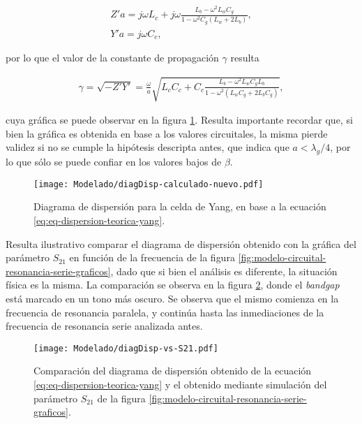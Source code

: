 \begin{align}
	Z' a = j\omega L_c + j\omega \frac{L_b - \omega^2 L_w C_g}{1-\omega^2 C_g (L_w + 2 L_b)}, \\
	Y' a = j \omega C_c,
\end{align}

por lo que el valor de la constante de propagación $\gamma$ resulta

\begin{align}
	\label{eq:eq-dispersion-teorica-yang}
	\gamma = \sqrt{-Z' Y'} = \frac{\omega}{a} \sqrt{L_c C_c + C_c \frac{L_b - \omega^2 L_w C_g L_b}{1-\omega^2(L_w C_g + 2 L_b C_g)}},
\end{align}

cuya gráfica se puede observar en la figura \ref{fig:grafica-diagdisp-celdaYang-teorica}. Resulta importante recordar que, si bien la gráfica es obtenida en base a los valores circuitales, la misma pierde validez si no se cumple la hipótesis descripta antes, que indica que $a < \lambda_g/4$, por lo que sólo se puede confiar en los valores bajos de $\beta$.

\begin{figure}[h]
	\centering
	\texttt{[image: Modelado/diagDisp-calculado-nuevo.pdf]}
	\caption{Diagrama de dispersión para la celda de Yang, en base a la ecuación \ref{eq:eq-dispersion-teorica-yang}.}
	\label{fig:grafica-diagdisp-celdaYang-teorica}
\end{figure}

Resulta ilustrativo comparar el diagrama de dispersión obtenido con la gráfica del parámetro $S_{21}$ en función de la frecuencia de la figura \ref{fig:modelo-circuital-resonancia-serie-graficos}, dado que si bien el análisis es diferente, la situación física es la misma. La comparación se observa en la figura \ref{fig:diagDisp-vs-S21}, donde el \textit{bandgap} está marcado en un tono más oscuro. Se observa que el mismo comienza en la frecuencia de resonancia paralela, y continúa hasta las inmediaciones de la frecuencia de resonancia serie analizada antes.

\begin{figure}[h]
	\centering
	\texttt{[image: Modelado/diagDisp-vs-S21.pdf]}
	\caption{Comparación del diagrama de dispersión obtenido de la ecuación \ref{eq:eq-dispersion-teorica-yang} y el obtenido mediante simulación del parámetro $S_{21}$ de la figura \ref{fig:modelo-circuital-resonancia-serie-graficos}.}
	\label{fig:diagDisp-vs-S21}
\end{figure}


